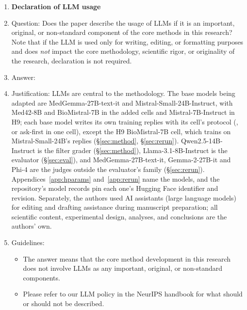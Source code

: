 \begin{enumerate}
\item {\bf Declaration of LLM usage}
    \item[] Question: Does the paper describe the usage of LLMs if it is an important, original, or non-standard component of the core methods in this research? Note that if the LLM is used only for writing, editing, or formatting purposes and does \emph{not} impact the core methodology, scientific rigor, or originality of the research, declaration is not required.
    \item[] Answer: \answerYes{}
    \item[] Justification: LLMs are central to the methodology. The base models being adapted are MedGemma-27B-text-it and Mistral-Small-24B-Instruct, with Med42-8B and BioMistral-7B in the added cells and Mistral-7B-Instruct in H9; each base model writes its own training replies with its cell's protocol (\bodhi{}, or ask-first in one cell), except the H9 BioMistral-7B cell, which trains on Mistral-Small-24B's replies (\S\ref{sec:method}, \S\ref{sec:rerun}). Qwen2.5-14B-Instruct is the filter grader (\S\ref{sec:method}), Llama-3.1-8B-Instruct is the evaluator (\S\ref{sec:eval}), and MedGemma-27B-text-it, Gemma-2-27B-it and Phi-4 are the judges outside the evaluator's family (\S\ref{sec:rerun}). Appendices~\ref{app:hparams} and~\ref{app:rerun} name the models, and the repository's model records pin each one's Hugging Face identifier and revision. Separately, the authors used AI assistants (large language models) for editing and drafting assistance during manuscript preparation; all scientific content, experimental design, analyses, and conclusions are the authors' own.
    \item[] Guidelines:
    \begin{itemize}
        \item The answer \answerNA{} means that the core method development in this research does not involve LLMs as any important, original, or non-standard components.
        \item Please refer to our LLM policy in the NeurIPS handbook for what should or should not be described.
    \end{itemize}

\end{enumerate}
